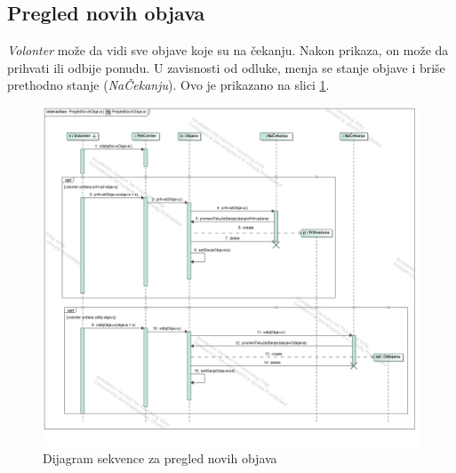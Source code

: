 \subsection{Pregled novih objava}
\par \textit{Volonter} može da vidi sve objave koje su na čekanju. Nakon prikaza, on može da prihvati ili odbije ponudu. U zavisnosti od odluke, menja se
stanje objave i briše prethodno stanje (\textit{NaČekanju}). Ovo je prikazano na slici \ref{fig:posts-list-seq}.
\begin{figure}[h]
    \centering
    \includegraphics[width=\textwidth, height=\textwidth]{img/new_posts-sequence.jpg}
    \caption{Dijagram sekvence za pregled novih objava}
    \label{fig:posts-list-seq}
\end{figure}
